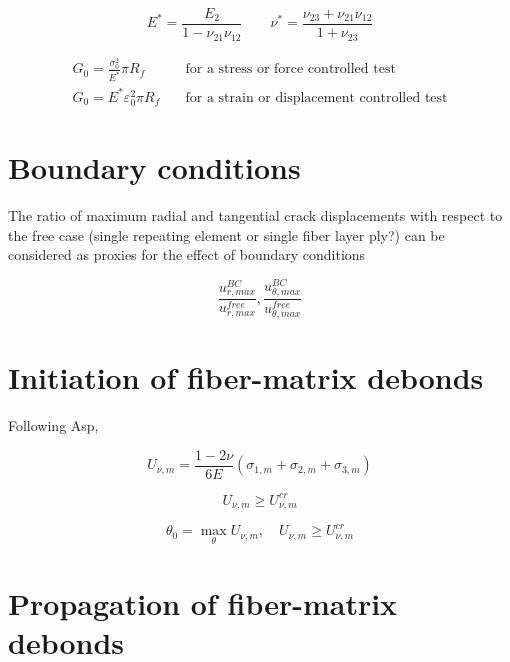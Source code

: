 \documentclass[review]{elsarticle}
\begin{document}
\begin{equation}\label{eq:equiplanestraintransiso}
E^{*}=\frac{E_{2}}{1-\nu_{21}\nu_{12}}\qquad\nu^{*}=\frac{\nu_{23}+\nu_{21}\nu_{12}}{1+\nu_{23}}
\end{equation}

\begin{equation}
\begin{split}
G_{0}=\frac{\sigma_{0}^{2}}{E^{*}}\pi R_{f}\quad&\text{for a stress or force controlled test}\\[5pt]
G_{0}=E^{*}\varepsilon_{0}^{2}\pi R_{f}\quad&\text{for a strain or displacement controlled test}
\end{split}
\end{equation}

\section{Boundary conditions}

The ratio of maximum radial and tangential crack displacements with respect to the free case (single repeating element or single fiber layer ply?) can be considered as proxies for the effect of boundary conditions

\begin{equation}
\frac{u^{BC}_{r,max}}{u^{free}_{r,max}},\frac{u^{BC}_{\theta,max}}{u^{free}_{\theta,max}}
\end{equation}

\section{Initiation of fiber-matrix debonds}

Following Asp,

\begin{equation}
U_{\nu,m}=\frac{1-2\nu}{6E}\left(\sigma_{1,m}+\sigma_{2,m}+\sigma_{3,m}\right)
\end{equation}

\begin{equation}
U_{\nu,m}\geq U_{\nu,m}^{cr}
\end{equation}

\begin{equation}
\theta_{0}=\max_{\theta}{U_{\nu,m}},\quad U_{\nu,m}\geq U_{\nu,m}^{cr}
\end{equation}

\section{Propagation of fiber-matrix debonds}
\end{document}

